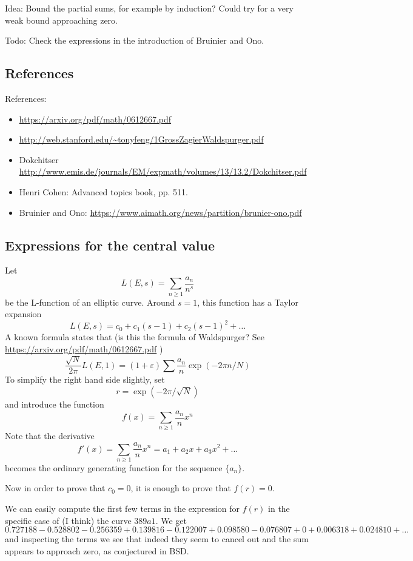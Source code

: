 \documentclass[paper=a4, fontsize=11pt]{scrartcl} %
\numberwithin{equation}{section} %
\numberwithin{figure}{section} %
\numberwithin{table}{section} %
\begin{document}
Idea: Bound the partial sums, for example by induction? Could try for a very weak bound approaching zero.

Todo: Check the expressions in the introduction of Bruinier and Ono.


\subsection{References}

References:

\begin{itemize}
\item \url{https://arxiv.org/pdf/math/0612667.pdf}
\item \url{http://web.stanford.edu/~tonyfeng/1GrossZagierWaldspurger.pdf}
\item Dokchitser \url{http://www.emis.de/journals/EM/expmath/volumes/13/13.2/Dokchitser.pdf}
\item Henri Cohen: Advanced topics book, pp. 511.
\item Bruinier and Ono: \url{https://www.aimath.org/news/partition/brunier-ono.pdf}
\end{itemize}


\subsection{Expressions for the central value}

Let
$$L(E, s) = \sum_{n \geq 1} \frac{a_n}{n^s}$$
be the L-function of an elliptic curve. Around $s=1$, this function has a Taylor expansion
$$ L(E, s) = c_0 + c_1 (s-1) + c_2 (s-1)^2 + \ldots  $$
A known formula states that (is this the formula of Waldspurger? See \url{https://arxiv.org/pdf/math/0612667.pdf} )
$$ \frac{\sqrt{N}}{2 \pi} L(E, 1) = (1 + \varepsilon) \sum \frac{a_n}{n} \exp(-2 \pi n / N)  $$
To simplify the right hand side slightly, set
$$ r = \exp(-2 \pi / \sqrt{N})  $$
and introduce the function
$$  f(x) = \sum_{n \geq 1} \frac{a_n}{n} x^n  $$
Note that the derivative
$$  f'(x) = \sum_{n \geq 1} \frac{a_n}{n} x^n  = a_1 + a_2 x + a_3 x^2 + \ldots  $$
becomes the ordinary generating function for the sequence $\{ a_n \}$.

Now in order to prove that $c_0 = 0$, it is enough to prove that $f(r) = 0$.

We can easily compute the first few terms in the expression for $f(r)$ in the specific case of (I think) the curve $389a1$. We get
$$ 0.727188 - 0.528802 - 0.256359 + 0.139816 - 0.122007 + 0.098580 - 0.076807 + 0 + 0.006318 + 0.024810 + \ldots   $$
and inspecting the terms we see that indeed they seem to cancel out and the sum appears to approach zero, as conjectured in BSD.
\end{document}
